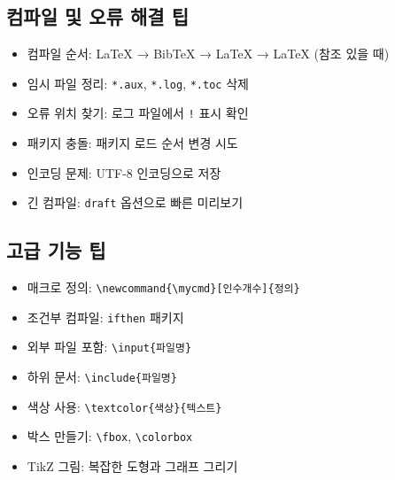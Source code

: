 \documentclass[12pt,a4paper]{article}
\begin{document}
\subsection{컴파일 및 오류 해결 팁}
\begin{itemize}
    \item 컴파일 순서: LaTeX → BibTeX → LaTeX → LaTeX (참조 있을 때)
    \item 임시 파일 정리: \texttt{*.aux}, \texttt{*.log}, \texttt{*.toc} 삭제
    \item 오류 위치 찾기: 로그 파일에서 \texttt{!} 표시 확인
    \item 패키지 충돌: 패키지 로드 순서 변경 시도
    \item 인코딩 문제: UTF-8 인코딩으로 저장
    \item 긴 컴파일: \texttt{draft} 옵션으로 빠른 미리보기
\end{itemize}

\subsection{고급 기능 팁}
\begin{itemize}
    \item 매크로 정의: \texttt{\textbackslash newcommand\{\textbackslash mycmd\}[인수개수]\{정의\}}
    \item 조건부 컴파일: \texttt{ifthen} 패키지
    \item 외부 파일 포함: \texttt{\textbackslash input\{파일명\}}
    \item 하위 문서: \texttt{\textbackslash include\{파일명\}}
    \item 색상 사용: \texttt{\textbackslash textcolor\{색상\}\{텍스트\}}
    \item 박스 만들기: \texttt{\textbackslash fbox}, \texttt{\textbackslash colorbox}
    \item TikZ 그림: 복잡한 도형과 그래프 그리기
\end{itemize}

\end{document}

